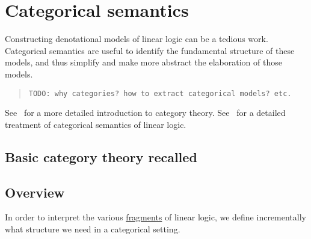 \chapter{Categorical semantics}\label{categorical-semantics}

Constructing denotational models of linear logic can be a tedious work.
Categorical semantics are useful to identify the fundamental structure
of these models, and thus simplify and make more abstract the
elaboration of those models.

\begin{quotation}
\texttt{TODO: why categories? how to extract categorical models? etc.}
\end{quotation}

See~\cite{categoriesworkmath} for a more detailed introduction to category theory. See~\cite{catsemll} for a detailed treatment of categorical semantics of linear logic.

\section{Basic category theory recalled}\label{basic-category-theory-recalled}

\begin{definition}[Category]
\end{definition}

\begin{definition}[Functor]
\end{definition}

\begin{definition}
\end{definition}

\begin{definition}[Adjunction]
\end{definition}


\begin{definition}[Monad]
\end{definition}



\section{Overview}\label{overview}

In order to interpret the various \hyperref[fragment]{fragments} of linear
logic, we define incrementally what structure we need in a categorical
setting.

